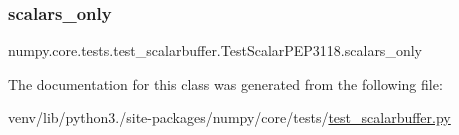 \subsubsection{\texorpdfstring{scalars\+\_\+only}{scalars\_only}}
{\footnotesize\ttfamily numpy.\+core.\+tests.\+test\+\_\+scalarbuffer.\+Test\+Scalar\+P\+E\+P3118.\+scalars\+\_\+only\hspace{0.3cm}{\ttfamily [static]}}



The documentation for this class was generated from the following file\+:\begin{DoxyCompactItemize}
\item 
venv/lib/python3./site-\/packages/numpy/core/tests/\hyperlink{test__scalarbuffer_8py}{test\+\_\+scalarbuffer.\+py}\end{DoxyCompactItemize}
